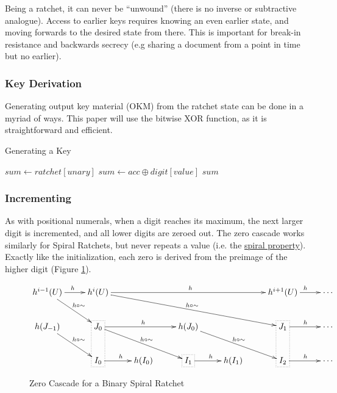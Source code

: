 \documentclass{article}
\begin{document}
	Being a ratchet, it can never be ``unwound'' (there is no inverse or subtractive analogue). Access to earlier keys requires knowing an even earlier state, and moving forwards to the desired state from there. This is important for break-in resistance and backwards secrecy (e.g sharing a document from a point in time but no earlier).

	\subsubsection{Key Derivation}

	Generating output key material (OKM) from the ratchet state can be done in a myriad of ways. This paper will use the bitwise XOR function, as it is straightforward and efficient.

	\begin{algorithm}
		\caption{Generating a Key}
		\label{alg:toKey}

		\begin{algorithmic}[1]
				\State $sum \gets ratchet[unary]$
					\State $sum \gets acc \oplus digit[value]$
				\EndFor
				\State $sum$
			\EndFunction
		\end{algorithmic}
	\end{algorithm}

	\FloatBarrier
	
	\subsubsection{Incrementing}
	
	As with positional numerals, when a digit reaches its maximum, the next larger digit is incremented, and all lower digits are zeroed out. The zero cascade works similarly for Spiral Ratchets, but never repeats a value (i.e. the \hyperref[{spiral-metaphor}]{spiral property}). Exactly like the initialization, each zero is derived from the preimage of the higher digit (Figure \ref{fig:zero-cascade}).
	
	\begin{figure}[h]
		\centering
		
		$\xymatrix{
		  h^{i-1}(U)
					\ar[r]^{h}
					\ar[dr]^{h \circ \sim}
				& h^{i}(U)
					\ar[rrrr]^{h}
					\ar[drrrr]^{h \circ \sim}
				&
				&
				&
				& h^{i + 1}(U)
					\ar[r]^{h}
				& \cdots
			\\    h(J_{-1})
					\ar[dr]^{h \circ \sim}
				& J_{0}
					\ar[rr]^{h}
					\ar[drr]^{h \circ \sim}
				&
				& h(J_{0})
					\ar[drr]^{h \circ \sim}
				&
				& J_{1}
					\ar[r]^{h}
				& \cdots
			\\  
				& I_{0}
					\ar[r]^{h}
				& h(I_{0})
				& I_{1}
					\ar[r]^{h}
				& h(I_{1})
				& I_{2}
					\ar[r]^{h}
				& \cdots
			\save
			"2,2" . "3,2" *[F.] \frm{}
			\restore
			\save
			"3,4" . "3,4" *[F.] \frm{}
			\restore
			\save
			"2,6" . "3,6" *[F.] \frm{}
			\restore
		}$
		
		\caption{Zero Cascade for a Binary Spiral Ratchet}
		\label{fig:zero-cascade}
	\end{figure}
	
\end{document}
